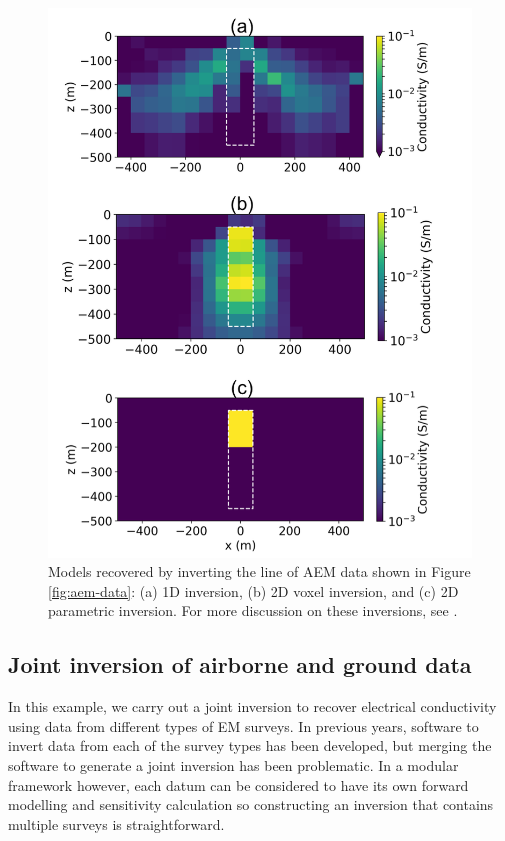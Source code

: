 \documentclass[paper]{geophysics}
\begin{document}
\begin{figure}
    \begin{center}
    \includegraphics[width=0.55\columnwidth]{figures/aem-inversions.png}
    \end{center}
\caption{
    Models recovered by inverting the line of AEM data shown in Figure \ref{fig:aem-data}:
    (a) 1D inversion, (b) 2D voxel inversion, and (c) 2D parametric inversion. For more discussion
    on these inversions, see \cite{Heagy2018}.
}
\label{fig:aem-inversions}
\end{figure}





\subsection{Joint inversion of airborne and ground data}

In this example, we carry out a joint inversion to recover electrical conductivity using data from different types of EM surveys. In previous years, software to invert data from each of the survey types has been developed, but merging the software to generate a joint inversion has been problematic. In a modular framework however, each datum can be considered to have its own forward modelling and sensitivity calculation so constructing an inversion that contains multiple surveys is straightforward.
\end{document}
